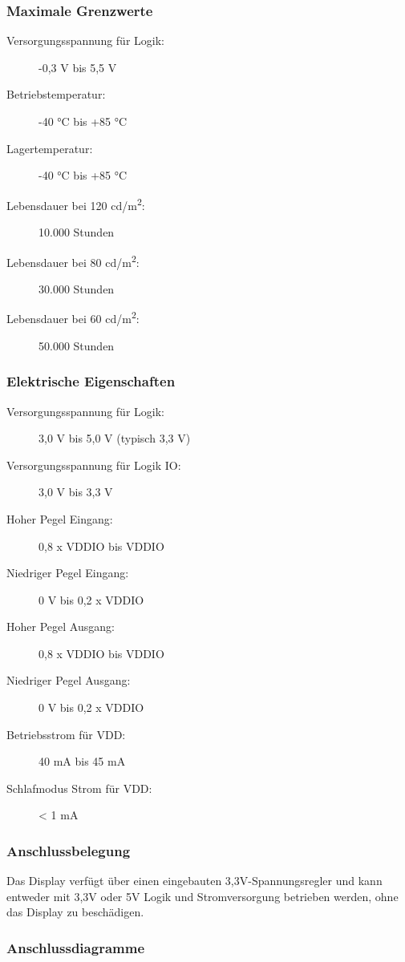 \subsubsection{Maximale Grenzwerte}
\begin{description}
    \item[Versorgungsspannung für Logik:] -0,3 V bis 5,5 V
    \item[Betriebstemperatur:] -40 °C bis +85 °C
    \item[Lagertemperatur:] -40 °C bis +85 °C
    \item[Lebensdauer bei 120 cd/m\textsuperscript{2}:] 10.000 Stunden
    \item[Lebensdauer bei 80 cd/m\textsuperscript{2}:] 30.000 Stunden
    \item[Lebensdauer bei 60 cd/m\textsuperscript{2}:] 50.000 Stunden
\end{description}

\subsubsection{Elektrische Eigenschaften}
\begin{description}
    \item[Versorgungsspannung für Logik:] 3,0 V bis 5,0 V (typisch 3,3 V)
    \item[Versorgungsspannung für Logik IO:] 3,0 V bis 3,3 V
    \item[Hoher Pegel Eingang:] 0,8 x VDDIO bis VDDIO
    \item[Niedriger Pegel Eingang:] 0 V bis 0,2 x VDDIO
    \item[Hoher Pegel Ausgang:] 0,8 x VDDIO bis VDDIO
    \item[Niedriger Pegel Ausgang:] 0 V bis 0,2 x VDDIO
    \item[Betriebsstrom für VDD:] 40 mA bis 45 mA
    \item[Schlafmodus Strom für VDD:] < 1 mA
\end{description}

\subsubsection{Anschlussbelegung}

Das Display verfügt über einen eingebauten 3,3V-Spannungsregler und kann entweder mit 3,3V oder 5V Logik und Stromversorgung betrieben werden, ohne das Display zu beschädigen.

\subsubsection{Anschlussdiagramme}

